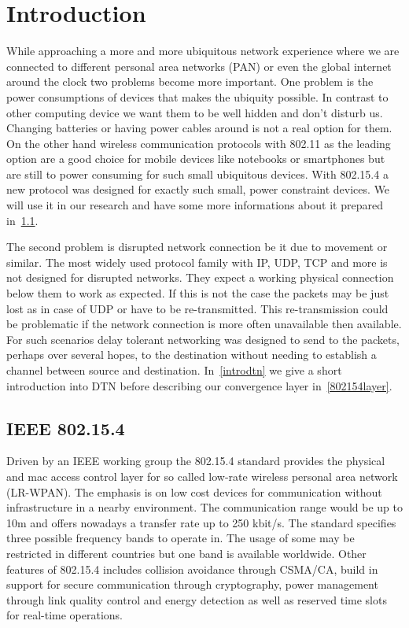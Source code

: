 \chapter{Introduction}
While approaching a more and more ubiquitous network experience where we are
connected to different personal area networks (PAN) or even the global internet
around the clock two problems become more important. One problem is the power
consumptions of devices that makes the ubiquity possible. In contrast to other
computing device we want them to be well hidden and don't disturb us. Changing
batteries or having power cables around is not a real option for them. On the
other hand wireless communication protocols with 802.11 \cite{ieee80211} as the
leading option are a good choice for mobile devices like notebooks or
smartphones but are still to power consuming for such small ubiquitous devices.
With 802.15.4 \cite{ieee802154} a new protocol was designed for exactly such
small, power constraint devices. We will use it in our research and have some
more informations about it prepared in~\ref{intro802154}.

The second problem is disrupted network connection be it due to movement or
similar. The most widely used protocol family with IP, UDP, TCP and more is not
designed for disrupted networks. They expect a working physical connection below
them to work as expected. If this is not the case the packets may be just lost
as in case of UDP or have to be re-transmitted. This re-transmission could be
problematic if the network connection is more often unavailable then available.
For such scenarios delay tolerant networking was designed to send to the
packets, perhaps over several hopes, to the destination without needing to
establish a channel between source and destination. In~\ref{introdtn} we give a
short introduction into DTN before describing our convergence layer
in~\ref{802154layer}.

\section{IEEE 802.15.4}
\label{intro802154}
Driven by an IEEE working group the 802.15.4 standard provides the physical and
mac access control layer for so called low-rate wireless personal area network
(LR-WPAN). The emphasis is on low cost devices for communication without
infrastructure in a nearby environment. The communication range would be up to
10m and offers nowadays a transfer rate up to 250 kbit/s. The standard specifies
three possible frequency bands to operate in. The usage of some may be
restricted in different countries but one band is available worldwide. Other
features of 802.15.4 includes collision avoidance through CSMA/CA, build in
support for secure communication through cryptography, power management through
link quality control and energy detection as well as reserved time slots for
real-time operations.

